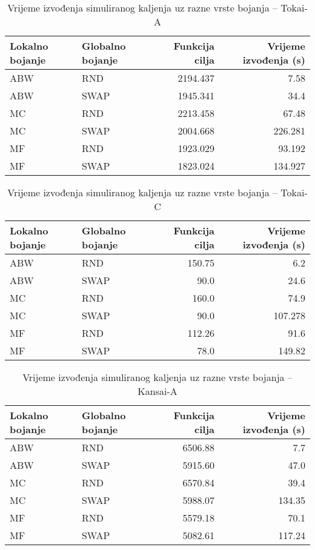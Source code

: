 \documentclass[times, utf8, diplomski, numeric]{fer}
\begin{document}
\begin{table}[htb]
	\caption{Vrijeme izvođenja simuliranog kaljenja uz razne vrste bojanja -- Tokai-A}
	\label{tbl:sa-cs1}
	\centering
	\begin{tabular}{|l||l|r|r|} \hline
	Lokalno bojanje & Globalno bojanje & Funkcija cilja & Vrijeme izvođenja (s)\\ \hline \hline
	ABW & RND & 2194.437 & 7.58 \\ \hline 
	ABW & SWAP & 1945.341 & 34.4 \\  \hline
	MC & RND & 2213.458 & 67.48 \\ \hline
	MC & SWAP & 2004.668 & 226.281 \\  \hline 
	MF & RND & 1923.029 & 93.192 \\ \hline
	MF & SWAP & 1823.024 & 134.927 \\ \hline
	\end{tabular}
\end{table}

\begin{table}[htb]
	\caption{Vrijeme izvođenja simuliranog kaljenja uz razne vrste bojanja -- Tokai-C}
	\label{tbl:sa-cs2}
	\centering
	\begin{tabular}{|l||l|r|r|} \hline
	Lokalno bojanje & Globalno bojanje & Funkcija cilja & Vrijeme izvođenja (s)\\ \hline \hline
	ABW & RND & 150.75 & 6.2 \\ \hline 
	ABW & SWAP & 90.0 & 24.6 \\  \hline
	MC & RND & 160.0 & 74.9 \\ \hline
	MC & SWAP & 90.0 & 107.278 \\  \hline 
	MF & RND & 112.26 & 91.6 \\ \hline
	MF & SWAP & 78.0 & 149.82 \\ \hline
	\end{tabular}
\end{table}

\begin{table}[htb]
	\caption{Vrijeme izvođenja simuliranog kaljenja uz razne vrste bojanja -- Kansai-A}
	\label{tbl:sa-cs3}
	\centering
	\begin{tabular}{|l||l|r|r|} \hline
	Lokalno bojanje & Globalno bojanje & Funkcija cilja & Vrijeme izvođenja (s)\\ \hline \hline
	ABW & RND & 6506.88 & 7.7 \\ \hline 
	ABW & SWAP & 5915.60 & 47.0 \\  \hline
	MC & RND & 6570.84 & 39.4 \\ \hline
	MC & SWAP & 5988.07 & 134.35 \\  \hline 
	MF & RND & 5579.18 & 70.1 \\ \hline
	MF & SWAP & 5082.61 & 117.24 \\ \hline
	\end{tabular}
\end{table}
\end{document}
